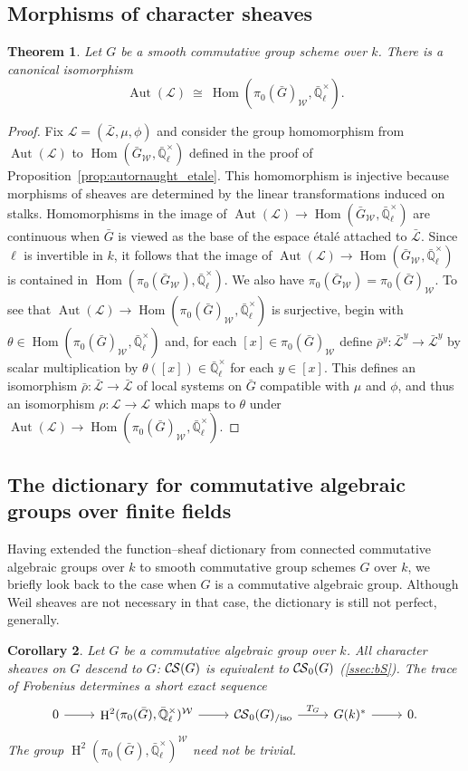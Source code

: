 \documentclass[10pt]{amsart}
\theoremstyle{plain}
\newtheorem{theorem}{Theorem}[section]
\newtheorem{corollary}[theorem]{Corollary}
\theoremstyle{definition}
\theoremstyle{remark}
\newcommand{\EE}{\mathbb{\bar Q}_\ell}
\newcommand{\Fq}{k}
\newcommand{\EEx}{\EE^\times}
\newcommand{\Weil}[1]{\mathcal{W}_{#1}}
\DeclareMathOperator{\Aut}{Aut}
\DeclareMathOperator{\Hom}{Hom}
\DeclareMathOperator{\Hh}{H}
\newcommand{\iso}{{\ \cong\ }}
\newcommand{\TrFrob}[1]{T_{#1}}
\newcommand{\cs}[1]{{\mathcal{#1}}}
\newcommand{\gcs}[1]{{\mathcal{\bar #1}}}
\newcommand{\CS}{{\mathcal{C\hskip-0.8pt S}}}
\newcommand{\bCS}{{\CS_0}}
\newcommand{\bCSiso}[1]{\bCS(#1)_{/\text{iso}}}
\newcommand{\bG}{\bar{G}}
\begin{document}
\subsection{Morphisms of character sheaves} \label{ssec:CSmor}

\begin{theorem}\label{thm:autornaught}
Let $G$ be a smooth commutative group scheme over $\Fq$.
There is a canonical isomorphism
\[
\Aut(\cs{L}) \iso \Hom(\pi_0(\bG)_{\Weil{}},\EEx).
\]
\end{theorem}
\begin{proof} 
Fix $\cs{L} = (\gcs{L},\mu,\phi)$ and consider the group homomorphism from $\Aut(\cs{L})$ to $\Hom(\bG_{\Weil{}},\EEx)$ defined in the proof of Proposition~\ref{prop:autornaught_etale}.
This homomorphism is injective because morphisms of sheaves are determined by the linear transformations induced on stalks.  
Homomorphisms in the image of $\Aut(\cs{L}) \to \Hom(\bG_{\Weil{}},\EEx)$ are continuous when $\bG$ is viewed as the base of the espace \'etal\'e attached to $\gcs{L}$.
Since $\ell$ is invertible in $\Fq$, it follows that the image of $\Aut(\cs{L}) \to \Hom(\bG_{\Weil{}},\EEx)$ is contained in $\Hom(\pi_0(\bG_{\Weil{}}),\EEx)$. 
We also have $\pi_0(\bG_{\Weil{}})=\pi_0(\bG)_{\Weil{}}$. 
To see that $\Aut(\cs{L}) \to \Hom(\pi_0(\bG)_{\Weil{}},\EEx)$ is surjective, begin with $\theta\in\Hom(\pi_0(\bG)_{\Weil{}},\EEx)$ and, for each $[x] \in \pi_0(\bG)_{\Weil{}}$ define $\bar\rho^y: \gcs{L}^y \to \gcs{L}^y$ by scalar multiplication by $\theta([x])\in \EEx$ for each $y\in [x]$.
This defines an isomorphism $\bar\rho : \gcs{L}\to \gcs{L}$ of local systems on $\bG$ compatible with $\mu$ and $\phi$, and thus an isomorphism $\rho :\cs{L}\to \cs{L}$ which maps to $\theta$ under $\Aut(\cs{L}) \to \Hom(\pi_0(\bG)_{\Weil{}},\EEx)$.
\end{proof}

\subsection{The dictionary for commutative algebraic groups over finite fields}

Having extended the function--sheaf dictionary from connected commutative algebraic groups over $\Fq$ to smooth commutative group schemes $G$ over $\Fq$, we briefly look back to the case when $G$ is a commutative algebraic group. 
Although Weil sheaves are not necessary in that case, the dictionary is still not perfect, generally.

\begin{corollary}\label{cor:alg_groups}
Let $G$ be a commutative algebraic group over $\Fq$.
All character sheaves on $G$ descend to $G$: $\CS(G)$ is equivalent to $\bCS(G)$ (\ref{ssec:bS}).
The trace of Frobenius determines a short exact sequence
\[
\begin{tikzcd}
0 \arrow{r} & \Hh^2(\pi_0(\bG),\EEx)^{\Weil{}} \arrow{r} & \bCSiso{G} \arrow{r}{\TrFrob{G}} & G(\Fq)^* \arrow{r} & 0.
\end{tikzcd}
\]
The group $\Hh^2(\pi_0(\bG),\EEx)^{\Weil{}}$ need not be trivial.
\end{corollary}
\end{document}
